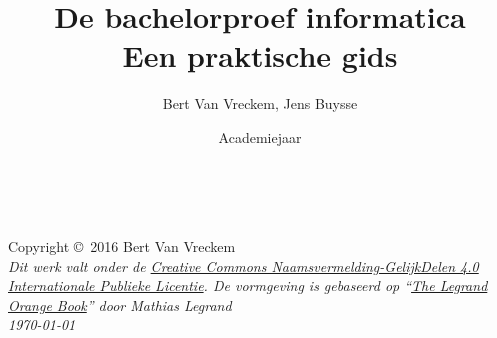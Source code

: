 \documentclass[11pt,fleqn,a4paper]{book}
\author{Bert Van Vreckem, Jens Buysse}
\title{De bachelorproef informatica\\Een praktische gids}
\date{Academiejaar \acadj}
\begin{document}
\thetitlepage


\newpage
~\vfill
\thispagestyle{empty}

\noindent Copyright \copyright\ 2016 Bert Van Vreckem\\ %

\noindent \textit{Dit werk valt onder de \href{http://creativecommons.org/licenses/by-sa/4.0/}{Creative Commons Naamsvermelding-GelijkDelen 4.0 Internationale Publieke Licentie}. De vormgeving is gebaseerd op ``\href{http://www.latextemplates.com/template/the-legrand-orange-book}{The Legrand Orange Book}'' door Mathias Legrand}\\

\noindent \textit{\today} %

\usechapterimagefalse

\tableofcontents %

\cleardoublepage %










\printbibliography[notkeyword=voorbeeld]
\end{document}
